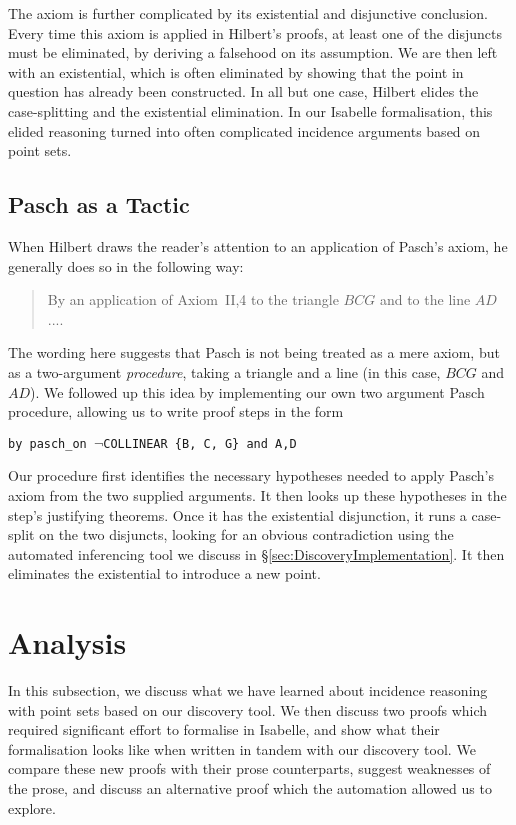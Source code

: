 The axiom is further complicated by its existential and disjunctive conclusion. Every time this axiom is applied in Hilbert's proofs, at least one of the disjuncts must be eliminated, by deriving a falsehood on its assumption. We are then left with an existential, which is often eliminated by showing that the point in question has already been constructed. In all but one case, Hilbert elides the case-splitting and the existential elimination. In our Isabelle formalisation, this elided reasoning turned into often complicated incidence arguments based on point sets.

\subsection{Pasch as a Tactic}
When Hilbert draws the reader's attention to an application of Pasch's axiom, he generally does so in the following way:
\begin{quote}By an application of Axiom~II,4 to the triangle $BCG$ and to the line $AD$....\end{quote}

The wording here suggests that Pasch is not being treated as a mere axiom, but as a two-argument \emph{procedure}, taking a triangle and a line (in this case, $BCG$ and $AD$). We followed up this idea by implementing our own two argument Pasch procedure, allowing us to write proof steps in the form

\vspace{0.5cm}
\texttt{\qquad\qquad by pasch\_on $\neg$COLLINEAR \{B, C, G\} and A,D}
\vspace{0.5cm}

Our procedure first identifies the necessary hypotheses needed to apply Pasch's axiom from the two supplied arguments. It then looks up these hypotheses in the step's justifying theorems. Once it has the existential disjunction, it runs a case-split on the two disjuncts, looking for an obvious contradiction using the automated inferencing tool we discuss in \S\ref{sec:DiscoveryImplementation}. It then eliminates the existential to introduce a new point.

\section{Analysis}
In this subsection, we discuss what we have learned about incidence reasoning with point sets based on our discovery tool. We then discuss two proofs which required significant effort to formalise in Isabelle, and show what their formalisation looks like when written in tandem with our discovery tool. We compare these new proofs with their prose counterparts, suggest weaknesses of the prose, and discuss an alternative proof which the automation allowed us to explore.

